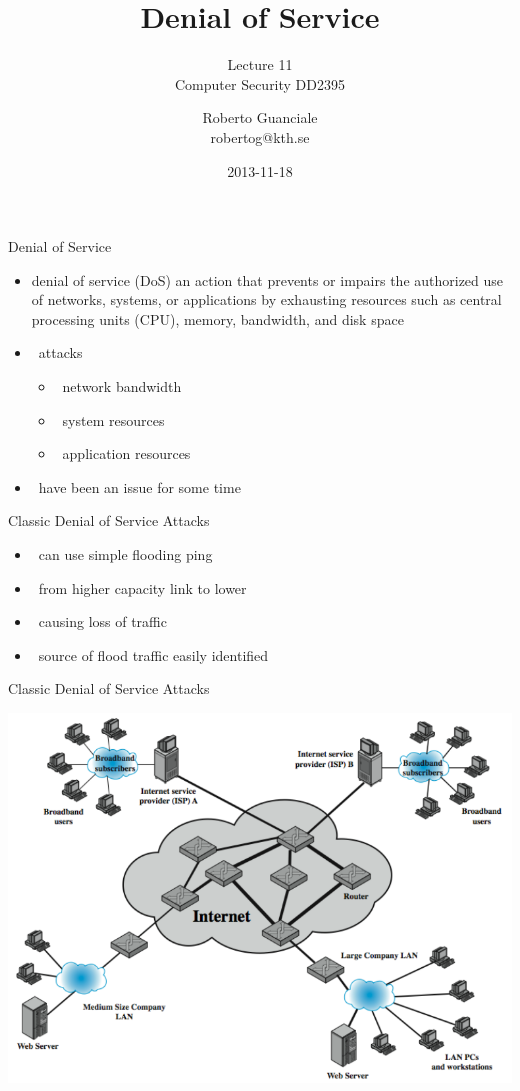 \documentclass{beamer}
\title{Denial of Service}
\subtitle{Lecture 11 \\ Computer Security DD2395}
\author[R. Guanciale]{
  Roberto Guanciale\\
  robertog@kth.se
}
\date{2013-11-18}
\begin{document}
\begin{frame}[plain]
  \titlepage
\end{frame}

\begin{frame}{Denial of Service}
  \begin{itemize}
  \item denial of service (DoS) an action that prevents or 
    impairs the authorized use of networks, systems, or 
    applications by exhausting resources such as central 
    processing units (CPU), memory, bandwidth, and 
    disk space 
  \item  attacks 
  \begin{itemize}
    \item  network bandwidth 
    \item  system resources 
    \item  application resources 
  \end{itemize}
  \item  have been an issue for some time
  \end{itemize}
\end{frame}

\begin{frame}{Classic Denial of Service Attacks}
  \begin{itemize}
  \item  can use simple flooding ping 
  \item  from higher capacity link to lower 
  \item  causing loss of traffic 
  \item  source of flood traffic easily identified
  \end{itemize}
\end{frame}

\begin{frame}{Classic Denial of Service Attacks}
  \begin{center}
    \includegraphics[width=0.8\linewidth]{standard_dos}
  \end{center}
\end{frame}
\end{document}
